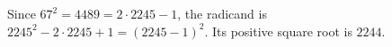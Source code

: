 Since $67^2=4489=2\cdot2245-1$, the radicand is $2245^2-2\cdot2245+1=(2245-1)^2$. Its positive square root is $\boxed{2244}$.
